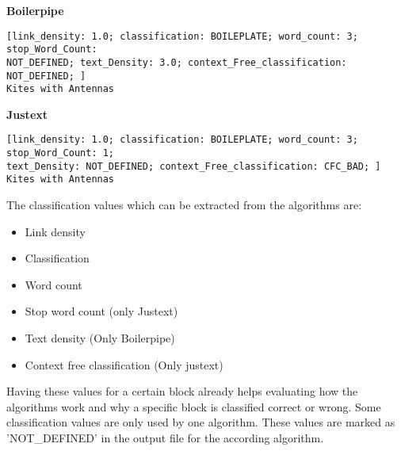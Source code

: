 \textbf{Boilerpipe}
\begin{lstlisting}
[link_density: 1.0; classification: BOILEPLATE; word_count: 3; stop_Word_Count: 
NOT_DEFINED; text_Density: 3.0; context_Free_classification: NOT_DEFINED; ]
Kites with Antennas
\end{lstlisting}


\textbf{Justext}
\begin{lstlisting}
[link_density: 1.0; classification: BOILEPLATE; word_count: 3; stop_Word_Count: 1; 
text_Density: NOT_DEFINED; context_Free_classification: CFC_BAD; ] 
Kites with Antennas
\end{lstlisting}

The classification values which can be extracted from the algorithms are:

\begin{itemize}
\item Link density
\item Classification
\item Word count
\item Stop word count (only Justext)
\item Text density (Only Boilerpipe)
\item Context free classification (Only justext)
\end{itemize}

Having these values for a certain block already helps evaluating how the algorithms work and why a specific block is classified correct or wrong. Some classification values are only used by one algorithm. These values are marked as 'NOT\_DEFINED' in the output file for the according algorithm.
